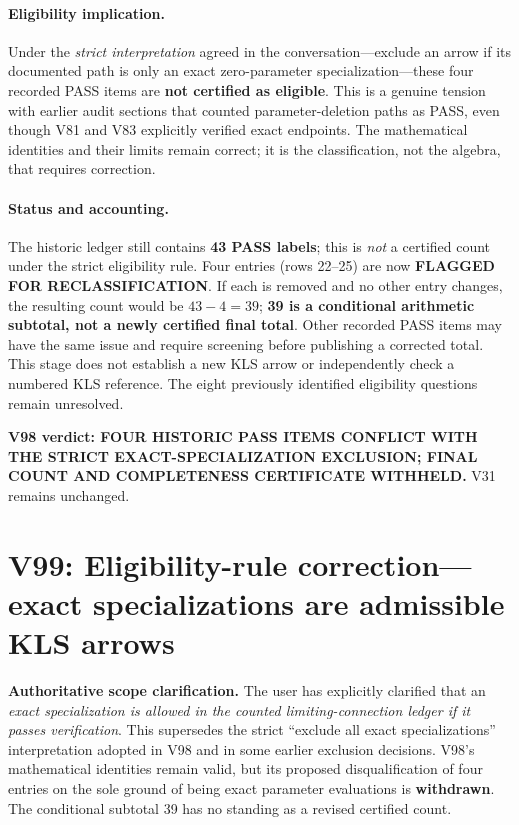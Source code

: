 \documentclass[11pt]{article}
\begin{document}
\paragraph{Eligibility implication.}
Under the \emph{strict interpretation} agreed in the conversation---exclude an arrow if its documented path is only an exact zero-parameter specialization---these four recorded PASS items are \textbf{not certified as eligible}. This is a genuine tension with earlier audit sections that counted parameter-deletion paths as PASS, even though V81 and V83 explicitly verified exact endpoints. The mathematical identities and their limits remain correct; it is the classification, not the algebra, that requires correction.

\paragraph{Status and accounting.}
The historic ledger still contains \textbf{43 PASS labels}; this is \emph{not} a certified count under the strict eligibility rule. Four entries (rows 22--25) are now \textbf{FLAGGED FOR RECLASSIFICATION}. If each is removed and no other entry changes, the resulting count would be $43-4=39$; \textbf{39 is a conditional arithmetic subtotal, not a newly certified final total}. Other recorded PASS items may have the same issue and require screening before publishing a corrected total. This stage does not establish a new KLS arrow or independently check a numbered KLS reference. The eight previously identified eligibility questions remain unresolved.

\noindent\textbf{V98 verdict: FOUR HISTORIC PASS ITEMS CONFLICT WITH THE STRICT EXACT-SPECIALIZATION EXCLUSION; FINAL COUNT AND COMPLETENESS CERTIFICATE WITHHELD.} V31 remains unchanged.


\section{V99: Eligibility-rule correction---exact specializations are admissible KLS arrows}
\noindent\textbf{Authoritative scope clarification.} The user has explicitly clarified that an \emph{exact specialization is allowed in the counted limiting-connection ledger if it passes verification}. This supersedes the strict ``exclude all exact specializations'' interpretation adopted in V98 and in some earlier exclusion decisions. V98's mathematical identities remain valid, but its proposed disqualification of four entries on the sole ground of being exact parameter evaluations is \textbf{withdrawn}. The conditional subtotal 39 has no standing as a revised certified count.
\end{document}
